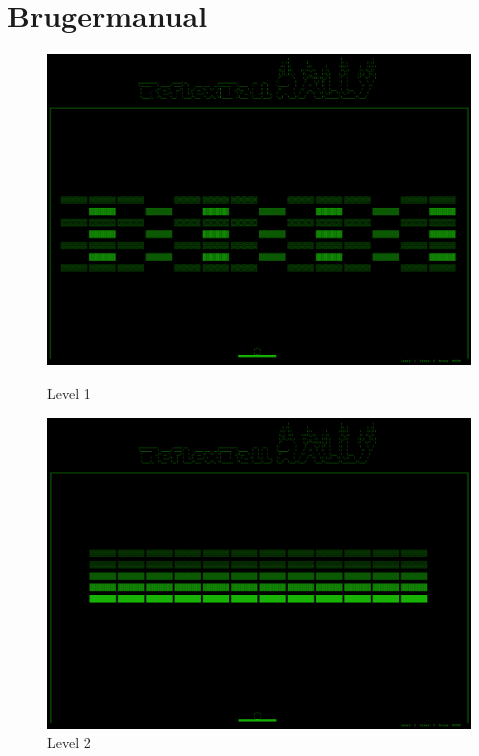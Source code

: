 \chapter{Brugermanual}

\begin{figure}[ht]
\begin{minipage}[b]{0.5\linewidth}
\centering
\includegraphics[scale=0.12]{figs/screenshots/level1.png}
\caption{Level 1}
\label{fig:level1}
\end{minipage}
\hspace{0.5cm}
\begin{minipage}[b]{0.5\linewidth}
\centering
\includegraphics[scale=0.12]{figs/screenshots/level2.png}
\caption{Level 2}
\label{fig:level2}
\end{minipage}
\end{figure}

